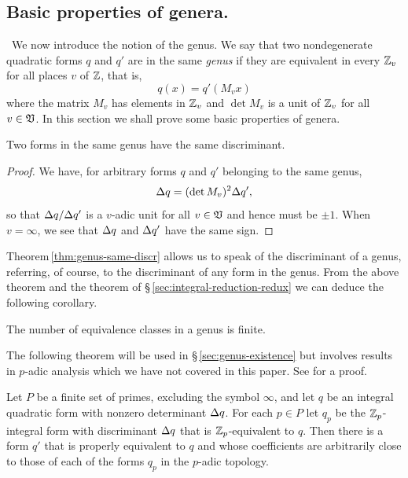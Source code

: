\subsection{Basic properties of genera.}~We now introduce the notion of the
genus. We say that two nondegenerate quadratic forms \(q\) and \(q'\) are in the
same \emph{genus} if they are equivalent in every \(\mathbb{Z}_v\) for all places
\(v\) of \(\mathbb{Z}\), that is,
\[
    q(x) = q'(M_v x)
\]
where the matrix \(M_v\) has elements in \(\mathbb{Z}_v\) and \(\det M_v\) is a
unit of \(\mathbb{Z}_v\) for all \(v \in \mathfrak{V}\). In this section we shall
prove some basic properties of genera.\label{sec:basic-properties-of-genera}

\begin{theoremx}\label{thm:genus-same-discr} {\normalfont
    \cite[p.\,140]{cassels2008rational}} Two forms in the same genus have the
    same discriminant.
\end{theoremx}

\begin{proof}
    We have, for arbitrary forms \(q\) and \(q'\) belonging to the same genus,
    \[
        {\Delta} q = (\det M_v)^2 {\Delta} q',
    \]
    so that \({\Delta} q/{\Delta} q'\) is a \(v\)-adic unit for all \(v \in
    \mathfrak{V}\) and hence must be \(\pm 1\). When \(v = \infty\), we see that
    \({\Delta} q\) and \({\Delta} q'\) have the same sign.
\end{proof}

Theorem\,\ref{thm:genus-same-discr} allows us to speak of the discriminant of a
genus, referring, of course, to the discriminant of any form in the genus. From
the above theorem and the theorem of \S\,\ref{sec:integral-reduction-redux} we
can deduce the following corollary.

\begin{corollary}
    The number of equivalence classes in a genus is finite.
\end{corollary}

The following theorem will be used in \S\,\ref{sec:genus-existence} but involves
results in \(p\)-adic analysis which we have not covered in this paper. See
\cite[p.\,140]{cassels2008rational} for a proof.

\begin{theoremx}
    \label{thm:genus-topology}
    Let \(P\) be a finite set of primes, excluding the symbol \(\infty\), and
    let \(q\) be an integral quadratic form with nonzero determinant \({\Delta}
    q\). For each \(p \in P\) let \(q_p\) be the \(\mathbb{Z}_p\)-integral form
    with discriminant \({\Delta} q\) that is \(\mathbb{Z}_p\)-equivalent to \(q\).
    Then there is a form \(q'\) that is properly equivalent to \(q\) and whose
    coefficients are arbitrarily close to those of each of the forms \(q_p\) in
    the \(p\)-adic topology.
\end{theoremx}

